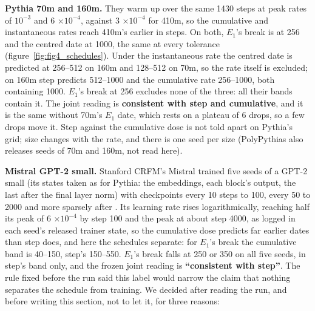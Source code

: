 \documentclass[11pt]{article}
\begin{document}
\textbf{Pythia 70m and 160m.} They warm up over the same 1430 steps at peak rates of $10^{-3}$ and 6 $\times 10^{-4}$, against 3 $\times 10^{-4}$ for 410m, so the cumulative and instantaneous rates reach 410m's earlier in steps. On both, $E_{1}$'s break is at 256 and the centred date at 1000, the same at every tolerance (figure~\ref{fig:fig4_schedules}). Under the instantaneous rate the centred date is predicted at 256--512 on 160m and 128--512 on 70m, so the rate itself is excluded; on 160m step predicts 512--1000 and the cumulative rate 256--1000, both containing 1000. $E_{1}$'s break at 256 excludes none of the three: all their bands contain it. The joint reading is \textbf{consistent with step and cumulative}, and it is the same without 70m's $E_{1}$ date, which rests on a plateau of 6 drops, so a few drops move it. Step against the cumulative dose is not told apart on Pythia's grid; size changes with the rate, and there is one seed per size (PolyPythias also releases seeds of 70m and 160m, not read here).

\textbf{Mistral GPT-2 small.} Stanford CRFM's Mistral trained five seeds of a GPT-2 small (its states taken as for Pythia: the embeddings, each block's output, the last after the final layer norm) with checkpoints every 10 steps to 100, every 50 to 2000 and more sparsely after \citep{crfm}. Its learning rate rises logarithmically, reaching half its peak of 6 $\times 10^{-4}$ by step 100 and the peak at about step 4000, as logged in each seed's released trainer state, so the cumulative dose predicts far earlier dates than step does, and here the schedules separate: for $E_{1}$'s break the cumulative band is 40--150, step's 150--550. $E_{1}$'s break falls at 250 or 350 on all five seeds, in step's band only, and the frozen joint reading is \textbf{``consistent with step''}. The rule fixed before the run said this label would narrow the claim that nothing separates the schedule from training. We decided after reading the run, and before writing this section, not to let it, for three reasons:
\end{document}
